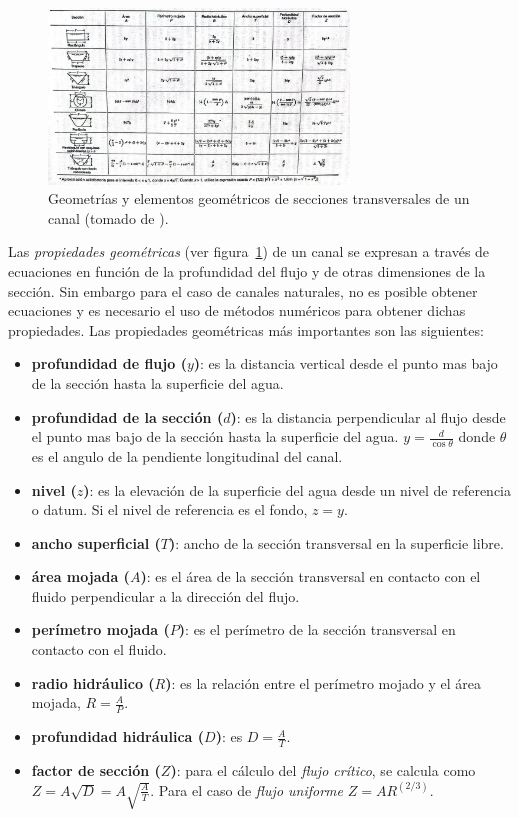 \documentclass[11pt, oneside]{article}
\begin{document}
\begin{figure}[h]
\centering
\includegraphics[width=8cm]{fig3.jpeg}
\caption{Geometr\'ias y elementos geom\'etricos de secciones transversales de un canal (tomado de \cite{VChow}).}
\label{fig3}
\end{figure}

Las \emph{propiedades geom\'etricas} (ver figura~\ref{fig3}) de un canal se expresan a través de ecuaciones en funci\'on de la profundidad del flujo y de otras dimensiones de la secci\'on. Sin embargo para el caso de canales naturales, no es posible obtener ecuaciones y es necesario el uso de m\'etodos num\'ericos para obtener dichas propiedades. Las propiedades geom\'etricas m\'as importantes son las siguientes:
\begin{itemize}
\item \textbf{profundidad de flujo ($y$)}: es la distancia vertical desde el punto mas bajo de la secci\'on hasta la superficie del agua. 
\item \textbf{profundidad de la secci\'on ($d$)}: es la distancia perpendicular al flujo desde el punto mas bajo de la sección hasta la superficie del agua. $y=\frac{d}{\cos \theta}$ donde $\theta$ es el angulo de la pendiente longitudinal del canal. 
\item \textbf{nivel ($z$)}: es la elevaci\'on de la superficie del agua desde un nivel de referencia o datum. Si el nivel de referencia es el fondo, $z=y$.
\item  \textbf{ancho superficial ($T$)}: ancho de la secci\'on transversal en la superficie libre. 
\item  \textbf{\'area mojada ($A$)}: es el \'area de la secci\'on transversal en contacto con el fluido perpendicular a la direcci\'on del flujo. 
\item  \textbf{perímetro mojada ($P$)}: es el per\'imetro de la secci\'on transversal en contacto con el fluido.
\item  \textbf{radio hidr\'aulico ($R$)}: es la relaci\'on entre el per\'imetro mojado y el \'area mojada, $R=\frac{A}{P}$.
\item  \textbf{profundidad hidr\'aulica ($D$)}: es  $D=\frac{A}{T}$.
\item  \textbf{factor de secci\'on ($Z$)}: para el c\'alculo del \emph{flujo cr\'itico}, se calcula como $Z= A\sqrt{D} = A \sqrt{\frac{A}{T}}$. Para el caso de \emph{flujo uniforme} $Z=AR^{(2/3)}$.
\end{itemize}
\end{document}
